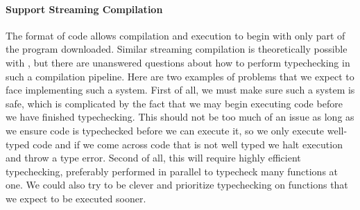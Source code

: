 \paragraph{Support Streaming Compilation}
The format of \wasm code allows compilation and execution to begin with only part of the program downloaded.
Similar streaming compilation is theoretically possible with \name, but there are unanswered questions about how to perform typechecking in such a compilation pipeline.
Here are two examples of problems that we expect to face implementing such a system.
First of all, we must make sure such a system is safe, which is complicated by the fact that we may begin executing code before we have finished typechecking.
This should not be too much of an issue as long as we ensure code is typechecked before we can execute it, so we only execute well-typed code and if we come across code that is not well typed we halt execution and throw a type error.
Second of all, this will require highly efficient typechecking, preferably performed in parallel to typecheck many functions at one.
We could also try to be clever and prioritize typechecking on functions that we expect to be executed sooner.
